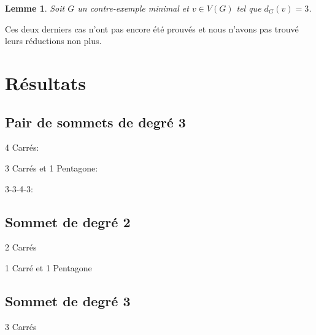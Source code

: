 \documentclass{beamer}
\newtheorem{lemme}{Lemme}
\begin{document}
\begin{frame}
\begin{lemme}
Soit $G$ un contre-exemple minimal et $v \in V(G)$ tel que $d_G(v) = 3$.
\label{le:3}
\end{lemme}
\end{frame}

\begin{frame}
Ces deux derniers cas n'ont pas encore été prouvés et nous n'avons pas trouvé leurs réductions non plus.
\end{frame}

\section{Résultats}
\begin{frame}

\end{frame}
\subsection{Pair de sommets de degré 3}
\begin{frame}
4 Carrés:
\end{frame}

\begin{frame}
3 Carrés et 1 Pentagone:
\end{frame}

\begin{frame}
3-3-4-3:

\end{frame}

\subsection{Sommet de degré 2}
\begin{frame}
2 Carrés
\end{frame}

\begin{frame}
1 Carré et 1 Pentagone
\end{frame}

\subsection{Sommet de degré 3}
\begin{frame}
3 Carrés
\end{frame}
\end{document}
